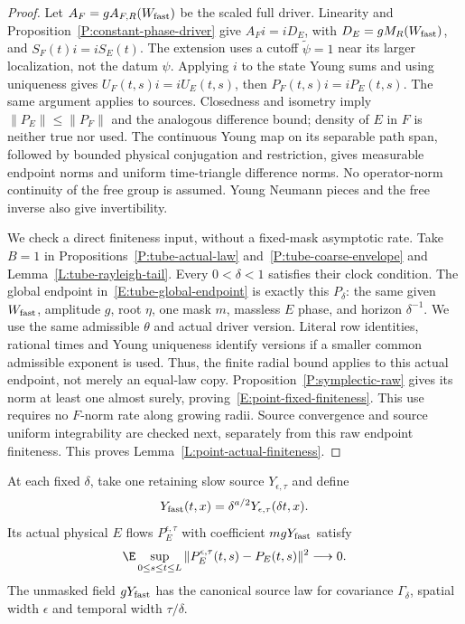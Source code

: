 \begin{proof}
  Let $A_F=gA_{F,R}(W_{\rm fast})$ be the scaled full driver.
  Linearity and Proposition~\ref{P:constant-phase-driver} give $A_Fi=iD_E$,
  with $D_E=gM_R(W_{\rm fast})$, and $S_F(t)i=iS_E(t)$.
  The extension uses a cutoff $\widetilde\psi=1$ near its larger
  localization, not the datum $\psi$.
  Applying $i$ to the state Young sums and using uniqueness gives
  $U_F(t,s)i=iU_E(t,s)$, then $P_F(t,s)i=iP_E(t,s)$.
  The same argument applies to sources.
  Closedness and isometry imply
  $\|P_E\|\le\|P_F\|$ and the analogous difference bound;
  density of $E$ in $F$ is neither true nor used.
  The continuous Young map on its separable path span, followed by
  bounded physical conjugation and restriction, gives measurable
  endpoint norms and uniform time-triangle difference norms.
  No operator-norm continuity of the free group is assumed.
  Young Neumann pieces and the free inverse also give invertibility.

  We check a direct finiteness input, without a fixed-mask asymptotic rate.
  Take $B=1$ in Propositions~\ref{P:tube-actual-law}
  and~\ref{P:tube-coarse-envelope} and Lemma~\ref{L:tube-rayleigh-tail}.
  Every $0<\delta<1$ satisfies their clock condition.
  The global endpoint in~\eqref{E:tube-global-endpoint} is exactly
  this $P_\delta$: the same given $W_{\rm fast}$, amplitude $g$,
  root $\eta$, one mask $m$, massless $E$ phase, and horizon $\delta^{-1}$.
  We use the same admissible $\theta$ and actual driver version.
  Literal row identities, rational times and Young uniqueness identify
  versions if a smaller common admissible exponent is used.
  Thus, the finite radial bound applies to this actual endpoint,
  not merely an equal-law copy.
  Proposition~\ref{P:symplectic-raw} gives its norm at least one
  almost surely, proving~\eqref{E:point-fixed-finiteness}.
  This use requires no $F$-norm rate along growing radii.
  Source convergence and source uniform integrability are checked next,
  separately from this raw endpoint finiteness.
  This proves Lemma~\ref{L:point-actual-finiteness}.
\end{proof}

\begin{lemma}\label{L:point-fast-sources}
  At each fixed $\delta$, take one retaining slow source
  $Y_{\epsilon,\tau}$ and define
  \[
    Y_{\rm fast}(t,x)=\delta^{a/2}Y_{\epsilon,\tau}(\delta t,x).
  \]
  Its actual physical $E$ flows $P_E^{\epsilon,\tau}$ with coefficient
  $m gY_{\rm fast}$ satisfy
  \begin{equation}\label{E:point-source-flow-limit}
    \E\sup_{0\le s\le t\le L}
    \|P_E^{\epsilon,\tau}(t,s)-P_E(t,s)\|^2\longrightarrow0 .
  \end{equation}
  The unmasked field $gY_{\rm fast}$ has the canonical source law
  for covariance $\Gamma_\delta$, spatial width $\epsilon$
  and temporal width $\tau/\delta$.
\end{lemma}

